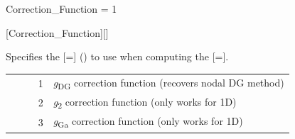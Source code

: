 
\FINALFIX{\newpage}
\begin{nmldescitem}
Correction_Function = 1
\end{nmldescitem}
[Correction\_Function][]

\begin{nmldescbody}
Specifies the [=]
()
to use when computing the
[=].
\\
\begin{tabular}{ @{\qquad} r @{ = } p{0.85\linewidth} @{} }
  1 & \textsl{g}\textsubscript{DG} correction function (recovers nodal DG
    method) \\
  2 & \textsl{g}\textsubscript{2} correction function (only works for 1D)\\
  3 & \textsl{g}\textsubscript{Ga} correction function (only works for 1D)
\end{tabular}
\end{nmldescbody}


